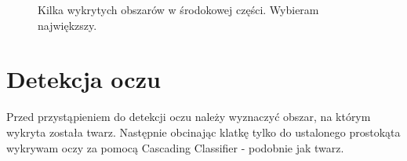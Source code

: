 \documentclass[10pt, a4paper]{article}
\begin{document}
\begin{itemize}
\begin{figure}[H]
\begin{center}
        \end{center}
        \caption{Kilka wykrytych obszarów w środokowej części. Wybieram najwiękzszy. \cite{readheadPortrait1}}
        \label{fig:face_size}
    \end{figure}
    
    
    
\end{itemize}


\section{Detekcja oczu}

Przed przystąpieniem do detekcji oczu należy wyznaczyć obszar, na którym wykryta została twarz. Następnie obcinając klatkę tylko do ustalonego prostokąta wykrywam oczy za pomocą Cascading Classifier - podobnie jak twarz.
\end{document}
